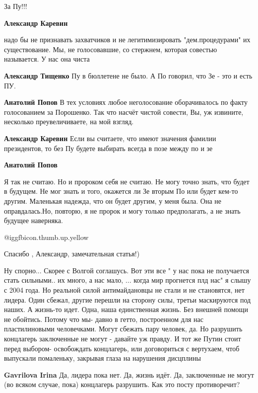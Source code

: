 \begin{itemize}
\begin{itemize}
За Пу!!!

\textbf{Александр Каревин} 

надо бы не признавать захватчиков и не легитимизировать "дем.процедурами" их
существование. Мы, не голосовавшие, со стержнем, которая совестью называется. У
нас она чиста

\textbf{Александр Тищенко} Пу в бюллетене не было. А По говорил, что Зе - это и есть ПУ.

\textbf{Анатолий Попов} В тех условиях любое неголосование оборачивалось по факту голосованием за Порошенко. Так что насчёт чистой совести, Вы, уж извините, несколько преувеличиваете, на мой взгляд.

\textbf{Александр Каревин} Если вы считаете, что имеют значения фамилии президентов, то без Пу будете выбирать всегда в позе между по и зе

\textbf{Анатолий Попов} 

Я так не считаю. Но и пророком себя не считаю. Не могу точно знать, что будет в
будущем. Не мог знать и того, окажется ли Зе вторым По или будет кем-то другим.
Маленькая надежда, что он будет другим, у меня была. Она не оправдалась.Но,
повторю, я не пророк и могу только предполагать, а не знать будущее наверняка.

\end{itemize} %

 @igg{fbicon.thumb.up.yellow} 

Спасибо , Александр, замечательная статья!)


Ну спорно... Скорее с Волгой соглашусь. Вот эти все " у нас пока не получается
стать сильными.. их много, а нас мало, ... когда мир прогнется плд нас" я слышу
с 2004 года. Но реальной силой антимайдановцы не стали и не становятся, нет
лидера. Один сбежал, другие перешли на сторону силы, третьи маскируются под
наших. А жизнь-то идет. Одна, наша единственная жизнь. Без внешней помощи не
обойтись. Потому что мы- давно в гетто, построенном для нас пластилиновыми
человечками. Могут сбежать пару человек, да. Но разрушить концлагерь
заключенные не могут - давайте уж правду. И тот же Путин стоит перед выбором-
освобождать концлагерь, или договориться с вертухаем, чтоб выпускали
помаленьку, закрывая глаза на нарушения дисцплины

\begin{itemize} %
\textbf{Gavrilova Irina} Да, лидера пока нет. Да, жизнь идёт. Да, заключенные не могут (во всяком случае, пока) концлагерь разрушить. Как это посту противоречит?
\end{itemize} %


\end{itemize}
